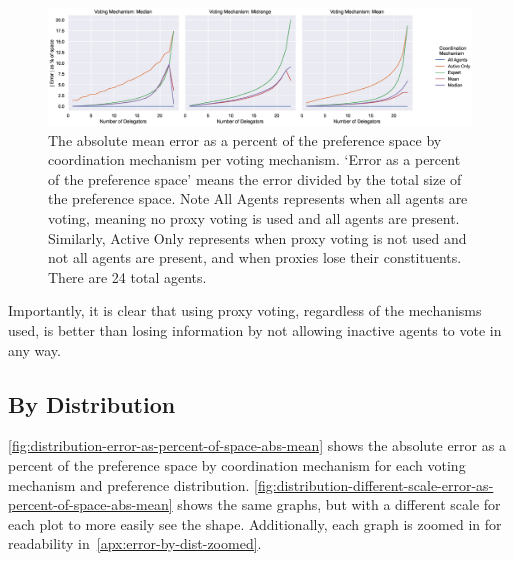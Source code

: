 \begin{landscape}
    \begin{figure}[p]
        \centering
        \includegraphics[scale=0.55]
        {content/chapter2/figures/vm_col_cm_hue_error_as_percent_of_space_abs_mean}
        \caption{
            The absolute mean error as a percent of the preference space by
            coordination mechanism per voting mechanism.
            `Error as a percent of the preference space' means the error divided by
            the total size of the preference space.
            Note All Agents represents when all agents are voting, meaning no proxy
            voting is used and all agents are present.
            Similarly, Active Only represents when proxy voting is not used and not
            all agents are present, and when proxies lose their constituents.
            There are 24 total agents.
        }
        \label{fig:vm-col-cm-hue-error-as-percent-of-space-abs-mean}
    \end{figure}
\end{landscape}

Importantly, it is clear that using proxy voting, regardless of the mechanisms used,
is better than losing information by not allowing inactive agents to vote in any way.

\subsection{By Distribution}\label{subsec:results-distribution}
\autoref{fig:distribution-error-as-percent-of-space-abs-mean} shows
the absolute error as a percent of the preference space by coordination mechanism for
each voting mechanism and preference distribution.
\autoref{fig:distribution-different-scale-error-as-percent-of-space-abs-mean} shows
the same graphs, but with a different scale for each plot to more easily see the shape.
Additionally, each graph is zoomed in for readability
in~\autoref{apx:error-by-dist-zoomed}.


